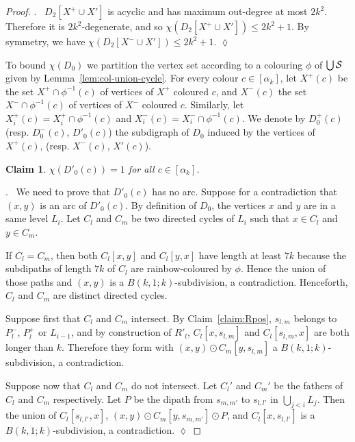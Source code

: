 \documentclass[utf8,10pt]{article}
\theoremstyle{plain}
\newtheorem{claim}{Claim}[theorem]
\theoremstyle{definition}
\theoremstyle{remark}
\newenvironment{subproof}{\par\noindent {\it Subproof}.\ }{\hfill$\lozenge$\par\vspace{11pt}}
\begin{document}
\begin{proof}
\begin{subproof}
$D_2[X^+\cup X']$ is acyclic and has maximum out-degree at most $2k^2$. Therefore it is $2k^2$-degenerate, and so $ \chi(D_2[X^+\cup X'])\leq 2k^2 +1$.
By symmetry, we have $ \chi(D_2[X^-\cup X'])\leq 2k^2 +1$.
\end{subproof}




To bound $\chi(D_0)$ we partition the vertex set according to a colouring $\phi$ of $\bigcup {\cal S}$ given by Lemma~\ref{lem:col-union-cycle}.
For every colour $c\in [\alpha_k]$, let $X^+(c)$ be the set $X^+\cap \phi^{-1}(c)$ of vertices of $X^+$ coloured $c$, and $X^-(c)$ the set $X^-\cap \phi^{-1}(c)$ of vertices of $X^-$ coloured $c$. Similarly, let  $X^+_i(c)= X^+_i\cap \phi^{-1}(c)$ and $X^-_i(c)= X^-_i\cap \phi^{-1}(c)$.
We denote by $D^+_0(c)$ (resp. $D^-_0(c)$, $D'_0(c)$) the subdigraph of $D_0$ induced by the vertices of $X^+(c)$, (resp. $X^-(c)$, $X'(c)$).

\begin{claim} \label{claim:X'}
$\chi(D'_0(c))= 1$ for all $c\in [\alpha_k]$.
\end{claim}

\begin{subproof}
We need to prove that $D'_0(c)$ has no arc.
Suppose for a contradiction that $(x,y)$ is an arc of $D'_0(c)$. 
By definition of $D_0$, the vertices $x$ and $y$ are in a same level $L_i$.
Let $C_l$ and $C_m$ be two directed cycles of $L_i$ such that $x \in C_l$ and $y \in C_m$.

If $C_l=C_m$, then both $C_l[x,y]$ and $C_l[y,x]$ have length at least $7k$ because the subdipaths of  length $7k$ of $C_l$ are rainbow-coloured by $\phi$. Hence the union of those paths and $(x,y)$ is  a $B(k,1;k)$-subdivision, a contradiction.
Henceforth, $C_l$ and $C_m$ are distinct directed cycles.



Suppose first that $C_l$ and $C_m$ intersect. By Claim~\ref{claim:Rpos}, $s_{l,m}$
belongs to $P^-_l$, $P^+_l$ or $L_{i-1}$, and by construction of $R'_l$, $C_l[x,s_{l,m}]$ and 
$C_l[s_{l,m},x]$ are both longer than $k$. Therefore they form with $(x,y) \odot C_m[y,s_{l,m}]$ a $B(k,1;k)$-subdivision, a contradiction.

Suppose now that $C_l$ and $C_m$ do not intersect. Let $C_l'$ and $C_m'$ be the fathers of $C_l$ and $C_m$ respectively. 
Let $P$ be the dipath  from $s_{m,m'}$ to $s_{l,l'}$ in $\bigcup_{j<i} L_j$. Then the union of $C_l[s_{l,l'}, x]$,
$(x,y) \odot C_m[y, s_{m,m'}] \odot P$, and $C_l[x,s_{l,l'}]$ is a $B(k,1;k)$-subdivision, a contradiction.
\end{subproof}










\end{proof}
\end{document}
